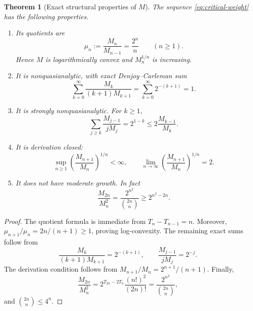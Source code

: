 \documentclass[11pt,a4paper]{article}
\newtheorem{theorem}{Theorem}[section]
\theoremstyle{definition}
\theoremstyle{remark}
\begin{document}
\begin{theorem}[Exact structural properties of $M$]
\label{thm:weight-properties}
The sequence \eqref{eq:critical-weight} has the following properties.
\begin{enumerate}[label=(\roman*)]
\item Its quotients are
\begin{equation}
  \mu_n:=\frac{M_n}{M_{n-1}}=\frac{2^n}{n}
  \qquad(n\ge1).
  \label{eq:quotient}
\end{equation}
Hence $M$ is logarithmically convex and $M_n^{1/n}$ is increasing.
\item It is nonquasianalytic, with exact Denjoy--Carleman sum
\begin{equation}
  \sum_{k=0}^{\infty}
  \frac{M_k}{(k+1)M_{k+1}}
  =\sum_{k=0}^{\infty}2^{-(k+1)}=1.
  \label{eq:nqa-sum}
\end{equation}
\item It is strongly nonquasianalytic.  For $k\ge1$,
\begin{equation}
  \sum_{j\ge k}\frac{M_{j-1}}{jM_j}
  =2^{1-k}
  \le2\frac{M_{k-1}}{M_k}.
  \label{eq:strong-nqa}
\end{equation}
\item It is derivation closed:
\begin{equation}
  \sup_{n\ge1}
  \left(\frac{M_{n+1}}{M_n}\right)^{1/n}<\infty,
  \qquad
  \lim_{n\to\infty}
  \left(\frac{M_{n+1}}{M_n}\right)^{1/n}=2.
  \label{eq:derivation-closed}
\end{equation}
\item It does not have moderate growth.  In fact
\begin{equation}
  \frac{M_{2n}}{M_n^2}
  =\frac{2^{n^2}}{\binom{2n}{n}}
  \ge2^{n^2-2n}.
  \label{eq:nonmoderate}
\end{equation}
\end{enumerate}
\end{theorem}

\begin{proof}
The quotient formula is immediate from $T_n-T_{n-1}=n$.  Moreover,
$\mu_{n+1}/\mu_n=2n/(n+1)\ge1$, proving log-convexity.
The remaining exact sums follow from
\[
  \frac{M_k}{(k+1)M_{k+1}}=2^{-(k+1)},
  \qquad
  \frac{M_{j-1}}{jM_j}=2^{-j}.
\]
The derivation condition follows from
$M_{n+1}/M_n=2^{n+1}/(n+1)$.  Finally,
\[
 \frac{M_{2n}}{M_n^2}
 =2^{T_{2n}-2T_n}\frac{(n!)^2}{(2n)!}
 =\frac{2^{n^2}}{\binom{2n}{n}},
\]
and $\binom{2n}{n}\le4^n$.
\end{proof}
\end{document}

